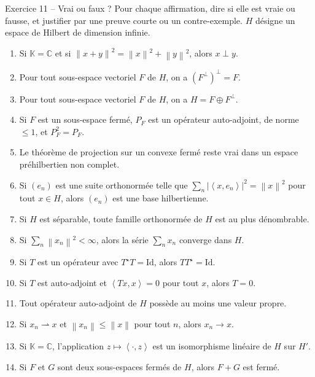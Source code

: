 \documentclass[11pt,a4paper]{article}
\newcommand{\C}{\mathbb{C}}
\newcommand{\K}{\mathbb{K}}
\newcommand{\norm}[1]{\left\|#1\right\|}
\newcommand{\ps}[2]{\left\langle #1,#2\right\rangle}
\theoremstyle{definition}
\begin{document}
\begin{exo}{Exercice 11 -- Vrai ou faux ?}
Pour chaque affirmation, dire si elle est vraie ou fausse, et justifier par une preuve courte ou un contre-exemple. $H$ désigne un espace de Hilbert de dimension infinie.
\begin{enumerate}[label=\arabic*.]
  \item Si $\K=\C$ et si $\norm{x+y}^2=\norm x^2+\norm y^2$, alors $x\perp y$.
  \item Pour tout sous-espace vectoriel $F$ de $H$, on a $(F^\perp)^\perp=F$.
  \item Pour tout sous-espace vectoriel $F$ de $H$, on a $H=F\oplus F^\perp$.
  \item Si $F$ est un sous-espace fermé, $P_F$ est un opérateur auto-adjoint, de norme $\le1$, et $P_F^2=P_F$.
  \item Le théorème de projection sur un convexe fermé reste vrai dans un espace préhilbertien non complet.
  \item Si $(e_n)$ est une suite orthonormée telle que $\sum_n|\ps x{e_n}|^2=\norm x^2$ pour tout $x\in H$, alors $(e_n)$ est une base hilbertienne.
  \item Si $H$ est séparable, toute famille orthonormée de $H$ est au plus dénombrable.
  \item Si $\sum_n\norm{x_n}^2<\infty$, alors la série $\sum_nx_n$ converge dans $H$.
  \item Si $T$ est un opérateur avec $T^\star T=\mathrm{Id}$, alors $TT^\star=\mathrm{Id}$.
  \item Si $T$ est auto-adjoint et $\ps{Tx}x=0$ pour tout $x$, alors $T=0$.
  \item Tout opérateur auto-adjoint de $H$ possède au moins une valeur propre.
  \item Si $x_n\rightharpoonup x$ et $\norm{x_n}\le\norm x$ pour tout $n$, alors $x_n\to x$.
  \item Si $\K=\C$, l'application $z\mapsto\ps\cdot z$ est un isomorphisme linéaire de $H$ sur $H'$.
  \item Si $F$ et $G$ sont deux sous-espaces fermés de $H$, alors $F+G$ est fermé.
\end{enumerate}
\end{exo}
\end{document}
